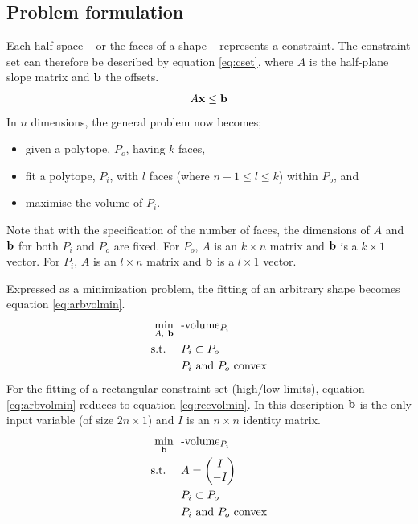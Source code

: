\subsection{Problem formulation}
Each half-space -- or the faces of a shape -- represents a constraint.
The constraint set can therefore be described by equation \ref{eq:cset}, where $A$ is the half-plane slope matrix and ${\bf {b}}$ the offsets.
\begin{equation}
  \label{eq:cset}
  A{\bf {x}} \leq {\bf {b}}
\end{equation}
In $n$ dimensions, the general problem now becomes; 
\begin{itemize}
  \item given a polytope, $P_o$, having $k$ faces,
  \item fit a polytope, $P_i$, with $l$ faces (where $n+1 \leq l \le k$) within $P_o$, and
  \item maximise the volume of $P_i$.
\end{itemize} 
Note that with the specification of the number of faces, the dimensions of $A$ and ${\bf {b}}$ for both $P_i$ and $P_o$ are fixed.
For $P_o$, $A$ is an $k \times n$ matrix and ${\bf {b}}$ is a $k \times 1$ vector.
For $P_i$, $A$ is an $l \times n$ matrix and ${\bf {b}}$ is a $l \times 1$ vector.

Expressed as a minimization problem, the fitting of an arbitrary shape  becomes equation \ref{eq:arbvolmin}.
\begin{align}
  \label{eq:arbvolmin}
    \min_{A,~{\bf {b}}}~~&\text{-volume}_{P_i}\\
    \text{s.t.}~~~~ &P_i \subset P_o \notag \\
                    &P_i \text{~and~} P_o \text{~convex} \notag
\end{align}
For the fitting of a rectangular constraint set (high/low limits), equation \ref{eq:arbvolmin} reduces to equation \ref{eq:recvolmin}.
In this description ${\bf {b}}$ is the only input variable (of size $2n \times 1$) and $I$ is an $n\times n$ identity matrix.
\begin{align}
  \label{eq:recvolmin}
    \min_{{\bf {b}}}~~&\text{-volume}_{P_i}\\
    \text{s.t.}~~~~ &A = \begin{pmatrix} I \\ -I \end{pmatrix} \notag \\
                    &P_i \subset P_o \notag \\
                    &P_i \text{~and~} P_o \text{~convex} \notag
\end{align}

